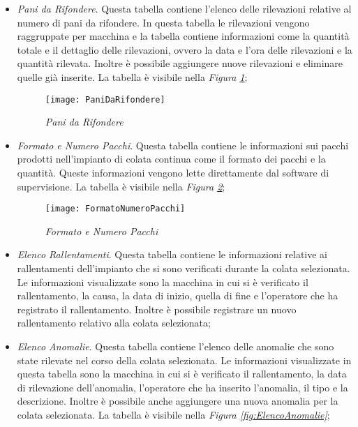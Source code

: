   \begin{itemize}
    \item \textit{Pani da Rifondere}. Questa tabella contiene l'elenco delle rilevazioni relative al numero di pani da rifondere.
    In questa tabella le rilevazioni vengono raggruppate per macchina e la tabella contiene informazioni come la quantità totale e
    il dettaglio delle rilevazioni, ovvero la data e l'ora delle rilevazioni e la quantità rilevata. Inoltre è possibile
    aggiungere nuove rilevazioni e eliminare quelle già inserite. La tabella è visibile nella
    \textit{Figura \ref{fig:PaniDaRifondere}};

    \begin{figure}[H]
      \texttt{[image: PaniDaRifondere]}
      \centering
      \caption{\textit{Pani da Rifondere}}
      \label{fig:PaniDaRifondere}
    \end{figure}
    
    \item \textit{Formato e Numero Pacchi}. Questa tabella contiene le informazioni sui pacchi prodotti nell'impianto di colata
    continua come il formato dei pacchi e la quantità. Queste informazioni vengono lette direttamente dal software
    di supervisione. La tabella è visibile nella \textit{Figura \ref{fig:FormatoNumeroPacchi}};

    \begin{figure}[H]
      \texttt{[image: FormatoNumeroPacchi]}
      \centering
      \caption{\textit{Formato e Numero Pacchi}}
      \label{fig:FormatoNumeroPacchi}
    \end{figure}
    
    \item \textit{Elenco Rallentamenti}. Questa tabella contiene le informazioni relative ai rallentamenti dell'impianto
    che si sono verificati durante la colata selezionata. Le informazioni visualizzate sono la macchina in cui si è verificato
    il rallentamento, la causa, la data di inizio, quella di fine e l'operatore che ha registrato il rallentamento.
    Inoltre è possibile registrare un nuovo rallentamento relativo alla colata selezionata;
    
     \item \textit{Elenco Anomalie}. Questa tabella contiene l'elenco delle anomalie che sono state rilevate nel corso della
    colata selezionata. Le informazioni visualizzate in questa tabella sono la macchina in cui si è verificato il
    rallentamento, la data di rilevazione dell'anomalia, l'operatore che ha inserito l'anomalia, il tipo e la descrizione.
    Inoltre è possibile anche aggiungere una nuova anomalia per la colata selezionata. La tabella è visibile nella
    \textit{Figura \ref{fig:ElencoAnomalie}};
    

\end{itemize}
